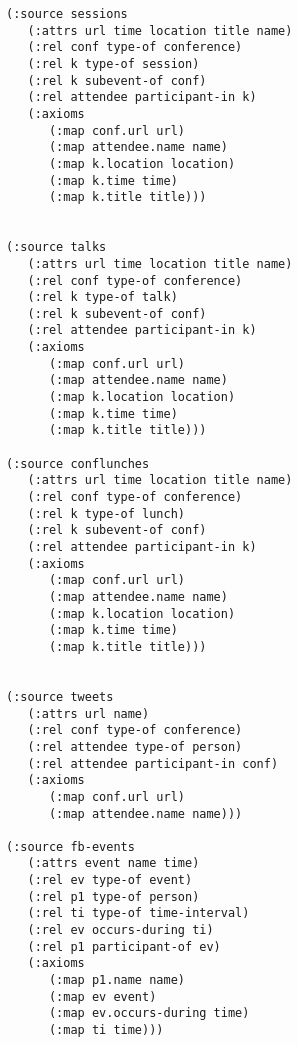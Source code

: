 \begin{verbatim}
(:source sessions
   (:attrs url time location title name)
   (:rel conf type-of conference)
   (:rel k type-of session)
   (:rel k subevent-of conf)
   (:rel attendee participant-in k)
   (:axioms
      (:map conf.url url)
      (:map attendee.name name)
      (:map k.location location)
      (:map k.time time)
      (:map k.title title)))


(:source talks
   (:attrs url time location title name)
   (:rel conf type-of conference)
   (:rel k type-of talk)
   (:rel k subevent-of conf)
   (:rel attendee participant-in k)
   (:axioms
      (:map conf.url url)
      (:map attendee.name name)
      (:map k.location location)
      (:map k.time time)
      (:map k.title title)))

(:source conflunches
   (:attrs url time location title name)
   (:rel conf type-of conference)
   (:rel k type-of lunch)
   (:rel k subevent-of conf)
   (:rel attendee participant-in k)
   (:axioms
      (:map conf.url url)
      (:map attendee.name name)
      (:map k.location location)
      (:map k.time time)
      (:map k.title title)))


(:source tweets
   (:attrs url name)
   (:rel conf type-of conference)
   (:rel attendee type-of person)
   (:rel attendee participant-in conf)
   (:axioms
      (:map conf.url url)
      (:map attendee.name name)))

(:source fb-events
   (:attrs event name time)
   (:rel ev type-of event)
   (:rel p1 type-of person)
   (:rel ti type-of time-interval)
   (:rel ev occurs-during ti)
   (:rel p1 participant-of ev)
   (:axioms
      (:map p1.name name)
      (:map ev event)
      (:map ev.occurs-during time)
      (:map ti time)))
\end{verbatim}